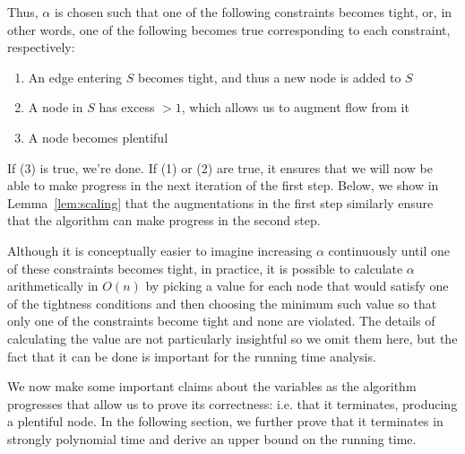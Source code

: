 \documentclass[11pt]{article}
\theoremstyle{definition}
\theoremstyle{definition}
\begin{document}
Thus, $\alpha$ is chosen such that one of the following constraints becomes
tight, or, in other words, one of the following becomes true corresponding to
each constraint, respectively:
\begin{enumerate}[itemsep=-1mm]
	\item An edge entering $S$ becomes tight, and thus a new node is added to $S$
	\item A node in $S$ has excess $>1$, which allows us to augment flow from it
	\item A node becomes plentiful
\end{enumerate}

If (3) is true, we're done. If (1) or (2) are true, it ensures that we will now
be able to make progress in the next iteration of the first step. Below, we show
in Lemma~\ref{lem:scaling} that the augmentations in the first step similarly ensure
that the algorithm can make progress in the second step. 

Although it is conceptually easier to imagine increasing $\alpha$ continuously
until one of these constraints becomes tight, in practice, it is possible to
calculate $\alpha$ arithmetically in $O(n)$ by picking a value for each node
that would satisfy one of the tightness conditions and then choosing the minimum
such value so that only one of the constraints become tight and none are
violated.
The details of calculating the value are not particularly insightful so we omit them here, but the
fact that it can be done is important for the running time analysis.

We now make some important claims about the variables as the algorithm
progresses that allow us to prove its correctness: i.e. that it terminates,
producing a plentiful node.
In the following section,
we further prove that it terminates in strongly polynomial time and derive
an upper bound on the running time.
\end{document}
